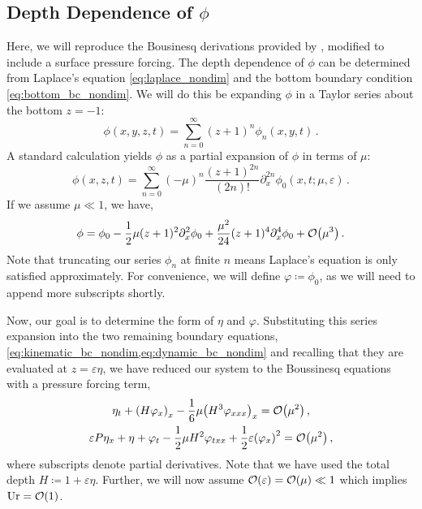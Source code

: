 \documentclass{jfm}
\DeclareMathOperator{\Ur}{Ur}
\renewcommand*{\epsilon}{\varepsilon}
\begin{document}
\subsection{Depth Dependence of \texorpdfstring{$\phi$}{Velocity Potential}}
Here, we will reproduce the Bousinesq derivations provided by
\citet{mei2005nonlinear}, modified to include a surface pressure
forcing.
The depth dependence of $\phi$ can be determined from Laplace's equation
\cref{eq:laplace_nondim} and the bottom boundary condition
\cref{eq:bottom_bc_nondim}.
We will do this be expanding $\phi$ in a Taylor series about the bottom
$z=-1$:
\begin{equation}
  \phi(x,y,z,t) = \sum_{n=0}^\infty (z+1)^n\phi_n(x,y,t) \,.
\end{equation}
A standard calculation \citep[\eg][]{mei2005nonlinear} yields $\phi$
as a partial expansion of $\phi$ in terms of $\mu$:
\begin{equation}
  \phi(x,z,t) = \sum_{n=0}^{\infty} (-\mu)^n \frac{(z+1)^{2n}}{(2n)!}
  \partial_x^{2n} \phi_0(x,t; \mu, \epsilon) \,.
  \label{eq:phi_expansion}
\end{equation}
If we assume $\mu \ll 1$, we have,
\begin{equation}
  \phi = \phi_0 - \frac{1}{2}\mu (z+1)^2\partial^2_x\phi_0 +
  \frac{\mu^2}{24}(z+1)^4\partial^4_x\phi_0 +
  \order{\mu^3} \,.
\end{equation}
Note that truncating our series $\phi_n$ at finite $n$ means
Laplace's equation is only satisfied approximately.
For convenience, we will define $\varphi \coloneqq \phi_0$, as we will
need to append more subscripts shortly.

Now, our goal is to determine the form of $\eta$ and $\varphi$.
Substituting this series expansion into the two
remaining boundary equations,
\cref{eq:kinematic_bc_nondim,eq:dynamic_bc_nondim} and recalling that
they are evaluated at $z=\epsilon \eta$, we have reduced our system to
the Boussinesq equations with a pressure forcing term,
\begin{gather}
  \eta_t + \pqty{H\varphi_x}_x
    -\frac{1}{6}\mu \pqty{H^3\varphi_{xxx}}_x =
    \order{\mu^2} \label{eq:kinematic_bc_varphi} \,, \\
  \epsilon P \eta_x + \eta + \varphi_t - \frac{1}{2}\mu H^2\varphi_{txx} +
    \frac{1}{2}\epsilon\pqty{\varphi_x}^2 = \order{\mu^2} \,,
  \label{eq:dynamic_bc_varphi}
\end{gather}
where subscripts denote partial derivatives.
Note that we have used the total depth $H\coloneqq 1+\epsilon\eta$.
Further, we will now assume $\order{\epsilon} = \order{\mu} \ll 1$ which
implies $\Ur = \order{1}$.
\end{document}
